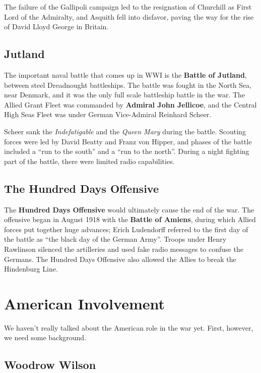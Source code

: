 The failure of the Gallipoli campaign led to the resignation of Churchill as First Lord of the Admiralty,
and Asquith fell into disfavor, paving the way for the rise of David Lloyd George in Britain.

\subsection*{Jutland}

The important naval battle that comes up in WWI is the \textbf{Battle of Jutland},
between steel Dreadnought battleships.
The battle was fought in the North Sea, near Denmark, and it was the only full scale battleship battle in the war.
The Allied Grant Fleet was commanded by \textbf{Admiral John Jellicoe},
and the Central High Seas Fleet was under German Vice-Admiral Reinhard Scheer.

Scheer sank the \textit{Indefatigable} and the \textit{Queen Mary} during the battle.
Scouting forces were led by David Beatty and Franz von Hipper,
and phases of the battle included a ``run to the south'' and a ``run to the north''.
During a night fighting part of the battle, there were limited radio capabilities.

\subsection*{The Hundred Days Offensive}

The \textbf{Hundred Days Offensive} would ultimately cause the end of the war.
The offensive began in August 1918 with the \textbf{Battle of Amiens},
during which Allied forces put together huge advances;
Erich Ludendorff referred to the first day of the battle as ``the black day of the German Army''.
Troops under Henry Rawlinson silenced the artilleries and used fake radio messages to confuse the Germans.
The Hundred Days Offensive also allowed the Allies to break the Hindenburg Line.

\section{American Involvement}

We haven't really talked about the American role in the war yet.
First, however, we need some background.

\subsection*{Woodrow Wilson}

